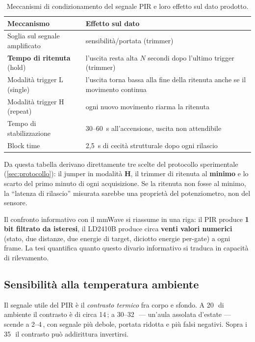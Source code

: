 \begin{table}[htbp]
\centering
\caption{Meccanismi di condizionamento del segnale PIR e loro effetto sul dato
prodotto.}
\label{tab:pir-meccanismi}
\small
\begin{tabularx}{\textwidth}{@{}lX@{}}
\toprule
\textbf{Meccanismo} & \textbf{Effetto sul dato} \\
\midrule
Soglia sul segnale amplificato & sensibilità/portata (trimmer) \\
\textbf{Tempo di ritenuta} (hold) & l'uscita resta alta $N$ secondi dopo l'ultimo
  trigger (trimmer) \\
Modalità trigger L (single) & l'uscita torna bassa alla fine della ritenuta anche
  se il movimento continua \\
Modalità trigger H (repeat) & ogni nuovo movimento riarma la ritenuta \\
Tempo di stabilizzazione & 30--60~s all'accensione, uscita non attendibile \\
Block time & 2,5~s di cecità strutturale dopo ogni rilascio \\
\bottomrule
\end{tabularx}
\end{table}

Da questa tabella derivano direttamente tre scelte del protocollo sperimentale
(\cref{sec:protocollo}): il jumper in modalità \textbf{H}, il trimmer di ritenuta
al \textbf{minimo} e lo scarto del primo minuto di ogni acquisizione. Se la
ritenuta non fosse al minimo, la ``latenza di rilascio'' misurata sarebbe una
proprietà del potenziometro, non del sensore.

Il confronto informativo con il mmWave si riassume in una riga: il PIR produce
\textbf{1 bit filtrato da isteresi}, il LD2410B produce circa \textbf{venti valori
numerici} (stato, due distanze, due energie di target, diciotto energie per-gate) a
ogni frame. La tesi quantifica quanto questo divario informativo si traduca in
capacità di rilevamento.

\subsection{Sensibilità alla temperatura ambiente}
\label{sec:pir-temperatura}

Il segnale utile del PIR è il \emph{contrasto termico} fra corpo e sfondo. A
20\,\celsius\ di ambiente il contrasto è di circa 14\,\celsius; a
30--32\,\celsius\ --- un'aula assolata d'estate --- scende a 2--4\,\celsius, con
segnale più debole, portata ridotta e più falsi negativi. Sopra i 35\,\celsius\ il
contrasto può addirittura invertirsi.

